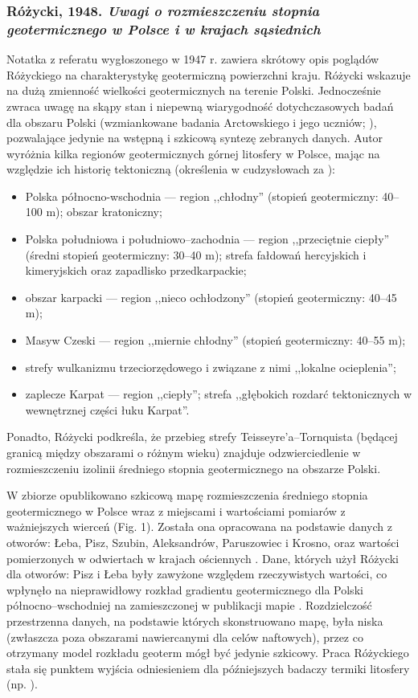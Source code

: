 \documentclass[11.5pt,twoside]{report}
\newcommand{\ct}[1]{\ignorespaces} %
\begin{document}
\subsubsection{Różycki, 1948. \textit{Uwagi o rozmieszczeniu stopnia geotermicznego w Polsce i w krajach sąsiednich}} \nocite{Rozycki.1948}
Notatka z referatu wygłoszonego w 1947 r. zawiera skrótowy opis poglądów Różyckiego na charakterystykę geotermiczną powierzchni kraju. Różycki wskazuje na dużą zmienność wielkości geotermicznych na terenie Polski. Jednocześnie zwraca uwagę na skąpy stan i niepewną wiarygodność dotychczasowych badań dla obszaru Polski (wzmiankowane badania Arctowskiego i jego uczniów; \ct{cite{bibid}}), pozwalające jedynie na wstępną i szkicową syntezę zebranych danych. Autor wyróżnia kilka regionów geotermicznych górnej litosfery w Polsce, mając na względzie ich historię tektoniczną (określenia w cudzysłowach za \cite{Rozycki.1948}):
 \begin{itemize}%
 	\item Polska północno-wschodnia --- region ,,chłodny'' (stopień geotermiczny: 40--100 m); obszar kratoniczny;
 	\item Polska południowa i południowo--zachodnia --- region ,,przeciętnie ciepły'' (średni stopień geotermiczny: 30--40 m); strefa fałdowań hercyjskich i kimeryjskich oraz zapadlisko przedkarpackie;
 	\item obszar karpacki --- region ,,nieco ochłodzony'' (stopień geotermiczny: 40--45 m);
 	\item Masyw Czeski --- region ,,miernie chłodny'' (stopień geotermiczny: 40--55 m);
 	\item strefy wulkanizmu trzeciorzędowego i związane z nimi ,,lokalne ocieplenia'';
 	\item zaplecze Karpat --- region ,,ciepły''; strefa ,,głębokich rozdarć tektonicznych w wewnętrznej części łuku Karpat''.
 \end{itemize}
Ponadto, Różycki podkreśla, że przebieg strefy Teisseyre'a--Tornquista (będącej granicą między obszarami o różnym wieku) znajduje odzwierciedlenie w rozmieszczeniu izolinii średniego stopnia geotermicznego na obszarze Polski.
 
W zbiorze opublikowano szkicową mapę rozmieszczenia średniego stopnia geotermicznego w Polsce wraz z miejscami i wartościami pomiarów z ważniejszych wierceń (Fig. 1). Została ona opracowana na podstawie danych z otworów: Łeba, Pisz, Szubin, Aleksandrów, Paruszowiec i Krosno, oraz wartości pomierzonych w odwiertach w krajach ościennych \parencite{Plewa.1966}. Dane, których użył Różycki dla otworów: Pisz i Łeba były zawyżone względem rzeczywistych wartości, co wpłynęło na nieprawidłowy rozkład gradientu geotermicznego dla Polski północno--wschodniej na zamieszczonej w publikacji mapie \parencite{Stenz.1954}. Rozdzielczość przestrzenna danych, na podstawie których skonstruowano mapę, była niska (zwłaszcza poza obszarami nawiercanymi dla celów naftowych), przez co otrzymany model rozkładu geoterm mógł być jedynie szkicowy. Praca Różyckiego stała się punktem wyjścia odniesieniem dla pó\'{z}niejszych badaczy termiki litosfery (np. \cite{Plewa.1966,Majorowicz.1971}).
	
\end{document}
